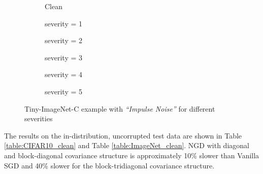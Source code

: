 \documentclass[a4paper, 11pt, oneside]{scrartcl}
\theoremstyle{break}
\newcommand{\matr}[1]{\boldsymbol{#1}}
\numberwithin{equation}{section}
\begin{document}
		\begin{figure}[H]
			\centering
			\hfill
			\begin{subfigure}{.16\textwidth}
				\centering
				Clean
			\end{subfigure}%
			\hfill
			\begin{subfigure}{.16\textwidth}
				\centering
				severity = 1
			\end{subfigure}%
			\hfill
			\begin{subfigure}{.16\textwidth}
				\centering
				severity = 2
			\end{subfigure}%
			\hfill
			\begin{subfigure}{.16\textwidth}
				\centering
				severity = 3
			\end{subfigure}%
			\hfill
			\begin{subfigure}{.16\textwidth}
				\centering
				severity = 4
			\end{subfigure}%
			\hfill
			\begin{subfigure}{.16\textwidth}
				\centering
				severity = 5
			\end{subfigure}%
			\caption{Tiny-ImageNet-C example with \emph{``Impulse Noise''} for different severities \parencite{HD19}}
			\label{fig:CIFAR10_corruption_severities}
		\end{figure}

		The results on the in-distribution, uncorrupted test data are shown in Table \ref{table:CIFAR10_clean} and Table \ref{table:ImageNet_clean}.
		NGD with diagonal and block-diagonal covariance structure is approximately 10\% slower than Vanilla SGD and 40\% slower for the block-tridiagonal covariance structure.
\end{document}
